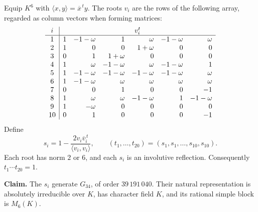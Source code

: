 \documentclass[11pt]{article}
\theoremstyle{definition}
\theoremstyle{remark}
\begin{document}
Equip \(K^6\) with \(\langle x,y\rangle=\overline{x}^{\,t}y\).  The roots
\(v_i\) are the rows of the following array, regarded as column vectors when
forming matrices:
\[
\begin{array}{c|rrrrrr}
i&\multicolumn{6}{c}{v_i^t}\\\hline
1&1&-1-\omega&1&\omega&-1-\omega&\omega\\
2&1&0&0&1+\omega&0&0\\
3&0&1&1+\omega&0&0&0\\
4&1&\omega&-1-\omega&\omega&-1-\omega&1\\
5&1&-1-\omega&-1-\omega&-1-\omega&-1-\omega&\omega\\
6&1&-1-\omega&\omega&\omega&\omega&\omega\\
7&0&0&1&0&0&-1\\
8&1&\omega&\omega&-1-\omega&1&-1-\omega\\
9&1&-\omega&0&0&0&0\\
10&0&1&0&0&0&-1
\end{array}
\]
Define
\[
 s_i=1-\frac{2v_i\overline v_i^{\,t}}{\langle v_i,v_i\rangle},\qquad
 (t_1,\ldots,t_{20})=(s_1,s_1,\ldots,s_{10},s_{10}).
\]
Each root has norm \(2\) or \(6\), and each \(s_i\) is an involutive
reflection.  Consequently \(t_1\cdots t_{20}=1\).

\textbf{Claim.} The \(s_i\) generate \(G_{34}\), of order \(39\,191\,040\).
Their natural representation is absolutely irreducible over \(K\), has
character field \(K\), and its rational simple block is \(M_6(K)\).
\end{document}
